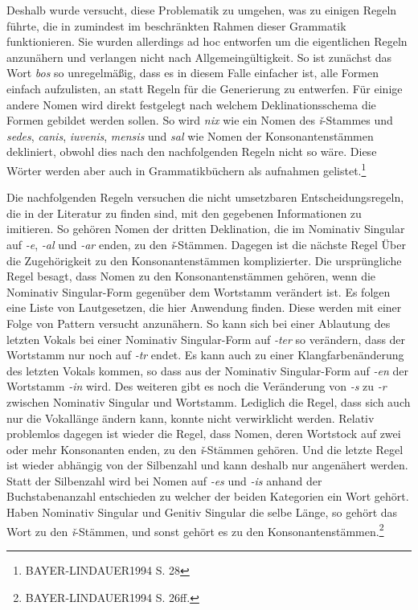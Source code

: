 \documentclass[12pt,abstract=on,titlepage,bibliography=totoc,ngerman,listof=totoc]{scrreprt}
\begin{document}
Deshalb wurde versucht, diese Problematik zu umgehen, was zu einigen Regeln führte, die in zumindest im beschränkten Rahmen dieser Grammatik funktionieren. Sie wurden allerdings ad hoc entworfen um die eigentlichen Regeln anzunähern und verlangen nicht nach Allgemeingültigkeit. So ist zunächst das Wort \textit{bos} so unregelmäßig, dass es in diesem Falle einfacher ist, alle Formen einfach aufzulisten, an statt Regeln für die Generierung zu entwerfen. Für einige andere Nomen wird direkt festgelegt nach welchem Deklinationsschema die Formen gebildet werden sollen. So wird \textit{nix} wie ein Nomen des \textit{ǐ}-Stammes und \textit{sedes}, \textit{canis}, \textit{iuvenis}, \textit{mensis} und \textit{sal} wie Nomen der Konsonantenstämmen dekliniert, obwohl dies nach den nachfolgenden Regeln nicht so wäre. Diese Wörter werden aber auch in Grammatikbüchern als aufnahmen gelistet.\footnote{BAYER-LINDAUER1994 S. 28} \par
Die nachfolgenden Regeln versuchen die nicht umsetzbaren Entscheidungsregeln, die in der Literatur zu finden sind, mit den gegebenen Informationen zu imitieren. So gehören Nomen der dritten Deklination, die im Nominativ Singular auf \textit{-e}, \textit{-al} und \textit{-ar} enden, zu den \textit{ǐ}-Stämmen. Dagegen ist die nächste Regel Über die Zugehörigkeit zu den Konsonantenstämmen komplizierter. Die ursprüngliche Regel besagt, dass Nomen zu den Konsonantenstämmen gehören, wenn die Nominativ Singular-Form gegenüber dem Wortstamm verändert ist. Es folgen eine Liste von Lautgesetzen, die hier Anwendung finden. Diese werden mit einer Folge von Pattern versucht anzunähern. So kann sich bei einer Ablautung des letzten Vokals bei einer Nominativ Singular-Form auf \textit{-ter} so verändern, dass der Wortstamm nur noch auf \textit{-tr} endet. Es kann auch zu einer Klangfarbenänderung des letzten Vokals kommen, so dass aus der Nominativ Singular-Form auf \textit{-en} der Wortstamm \textit{-in} wird. Des weiteren gibt es noch die Veränderung von \textit{-s} zu \textit{-r} zwischen Nominativ Singular und Wortstamm. Lediglich die Regel, dass sich auch nur die Vokallänge ändern kann, konnte nicht verwirklicht werden. Relativ problemlos dagegen ist wieder die Regel, dass Nomen, deren Wortstock auf zwei oder mehr Konsonanten enden, zu den \textit{ǐ}-Stämmen gehören. Und die letzte Regel ist wieder abhängig von der Silbenzahl und kann deshalb nur angenähert werden. Statt der Silbenzahl wird bei Nomen auf \textit{-es} und \textit{-is} anhand der Buchstabenanzahl entschieden zu welcher der beiden Kategorien ein Wort gehört. Haben Nominativ Singular und Genitiv Singular die selbe Länge, so gehört das Wort zu den \textit{ǐ}-Stämmen, und sonst gehört es zu den Konsonantenstämmen.\footnote{BAYER-LINDAUER1994 S. 26ff.} \par
\end{document}
